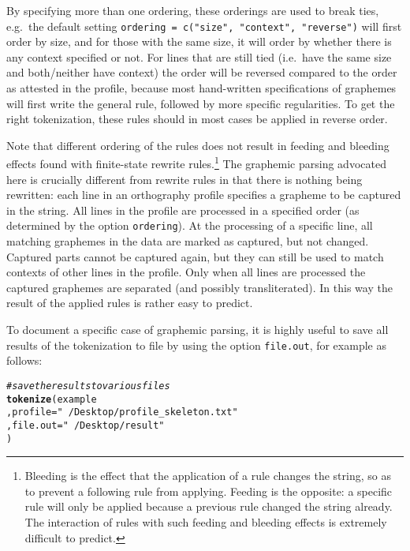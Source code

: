 \documentclass[output=book,nonflat,modfonts,
colorlinks, citecolor=brown,
		]{langsci/langscibook}\usepackage[]{graphicx}\usepackage[]{color}
\makeatletter
\newcommand{\hlstr}[1]{\textcolor[rgb]{0.192,0.494,0.8}{#1}}%
\newcommand{\hlcom}[1]{\textcolor[rgb]{0.678,0.584,0.686}{\textit{#1}}}%
\newcommand{\hlstd}[1]{\textcolor[rgb]{0.345,0.345,0.345}{#1}}%
\newcommand{\hlkwc}[1]{\textcolor[rgb]{0.333,0.667,0.333}{#1}}%
\newcommand{\hlkwd}[1]{\textcolor[rgb]{0.737,0.353,0.396}{\textbf{#1}}}%
\newenvironment{kframe}{%
 \def\at@end@of@kframe{}%
 \ifinner\ifhmode%
  \def\at@end@of@kframe{\end{minipage}}%
  \begin{minipage}{\columnwidth}%
 \fi\fi%
 \def\FrameCommand##1{\hskip\@totalleftmargin \hskip-\fboxsep
 \colorbox{shadecolor}{##1}\hskip-\fboxsep
     \hskip-\linewidth \hskip-\@totalleftmargin \hskip\columnwidth}%
 \MakeFramed {\advance\hsize-\width
   \@totalleftmargin\z@ \linewidth\hsize
   \@setminipage}}%
 {\par\unskip\endMakeFramed%
 \at@end@of@kframe}
\newenvironment{knitrout}{}{} %
\makeatother
\begin{document}
By specifying more than one ordering, these orderings are used to break ties,
e.g.\ the default setting \texttt{ordering = c("size", "context", "reverse")}
will first order by size, and for those with the same size, it will order by
whether there is any context specified or not. For lines that are still tied
(i.e.\ have the same size and both/neither have context) the order will be
reversed compared to the order as attested in the profile, because most
hand-written specifications of graphemes will first write the general rule,
followed by more specific regularities. To get the right tokenization, these 
rules should in most cases be applied in reverse order.

Note that different ordering of the rules does not result in 
feeding and bleeding effects found with finite-state rewrite
rules.\footnote{Bleeding is the effect that the application of a rule changes
the string, so as to prevent a following rule from applying. Feeding is the opposite: a
specific rule will only be applied because a previous rule changed the string
already. The interaction of rules with such feeding and bleeding effects is
extremely difficult to predict.} The graphemic parsing advocated here is 
crucially different from rewrite rules in that there is nothing being rewritten:
each line in an orthography profile specifies a grapheme to be captured in the 
string. All lines in the profile are processed in a specified order (as determined
by the option \texttt{ordering}). At the processing of a specific line, all 
matching graphemes in the data are marked as captured, but not changed. 
Captured parts cannot be captured again, but they can still be used to match 
contexts of other lines in the profile. Only when all lines are processed the 
captured graphemes are separated (and possibly transliterated). In this way the 
result of the applied rules is rather easy to predict.

To document a specific case of graphemic parsing, it is highly useful to save
all results of the tokenization to file by using the option \texttt{file.out},
for example as follows: 

\begin{knitrout}\footnotesize
{}\color{fgcolor}\begin{kframe}
\begin{alltt}
\hlcom{# save the results to various files}
\hlkwd{tokenize}\hlstd{( example}
         \hlstd{,} \hlkwc{profile} \hlstd{=} \hlstr{"~/Desktop/profile_skeleton.txt"}
         \hlstd{,} \hlkwc{file.out} \hlstd{=} \hlstr{"~/Desktop/result"}
        \hlstd{)}
\end{alltt}
\end{kframe}
\end{knitrout}
\end{document}
